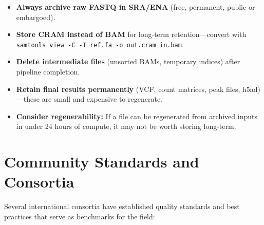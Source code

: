 \begin{tipbox}[title={When to Store Raw vs Processed Data}]
\begin{itemize}[nosep]
  \item \textbf{Always archive raw FASTQ in SRA/ENA} (free, permanent, public or embargoed).
  \item \textbf{Store CRAM instead of BAM} for long-term retention---convert with \texttt{samtools view -C -T ref.fa -o out.cram in.bam}.
  \item \textbf{Delete intermediate files} (unsorted BAMs, temporary indices) after pipeline completion.
  \item \textbf{Retain final results permanently} (VCF, count matrices, peak files, h5ad)---these are small and expensive to regenerate.
  \item \textbf{Consider regenerability:} If a file can be regenerated from archived inputs in under 24 hours of compute, it may not be worth storing long-term.
\end{itemize}
\end{tipbox}

\section{Community Standards and Consortia}
\label{sec:datastandards:standards}

Several international consortia have established quality standards and best practices that serve as benchmarks for the field:

